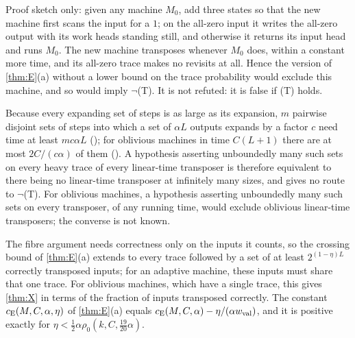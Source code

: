 \begin{remark}\label{rem:rare}
Proof sketch only: given any machine $M_0$, add three states so that the new machine first scans the input for a $1$; on the all-zero
input it writes the all-zero output with its work heads standing still, and otherwise it returns its input head and runs $M_0$. The
new machine transposes whenever $M_0$ does, within a constant more time, and its all-zero trace makes no revisits at all. Hence the
version of \cref{thm:E}(a) without a lower bound on the trace probability would exclude this machine, and so would imply $\neg$(T).
It is not refuted: it is false if (T) holds.
\end{remark}

\begin{remark}\label{rem:waves}
Because every expanding set of steps is as large as its expansion, $m$ pairwise disjoint sets of steps into which a set of $\alpha L$ outputs
expands by a factor $c$ need time at least $mc\alpha L$ (); for oblivious machines in time
$C(L+1)$ there are at most $2C/(c\alpha)$ of them (). A hypothesis asserting unboundedly many such
sets on every heavy trace of every linear-time transposer is therefore equivalent to there being no linear-time transposer at
infinitely many sizes, and gives no route to $\neg$(T). For oblivious machines, a hypothesis asserting unboundedly many such sets on every
transposer, of any running time, would exclude oblivious linear-time transposers; the converse is not known.
\end{remark}

The fibre argument needs correctness only on the inputs it counts, so the crossing bound of \cref{thm:E}(a) extends to every trace
followed by a set of at least $2^{(1-\eta)L}$ correctly transposed inputs; for an adaptive machine, these inputs must share that one
trace. For oblivious machines, which have a single trace, this gives \cref{thm:X} in terms of the fraction of inputs transposed
correctly. The constant $c_{\mathrm{E}}(M,C,\alpha,\eta)$
of \cref{thm:E}(a) equals $c_{\mathrm{E}}(M,C,\alpha)-\eta/(\alpha w_{\mathrm{val}})$, and it is positive exactly for
$\eta<\frac12\alpha\rho_0(k,C,\tfrac{19}{20}\alpha)$.

